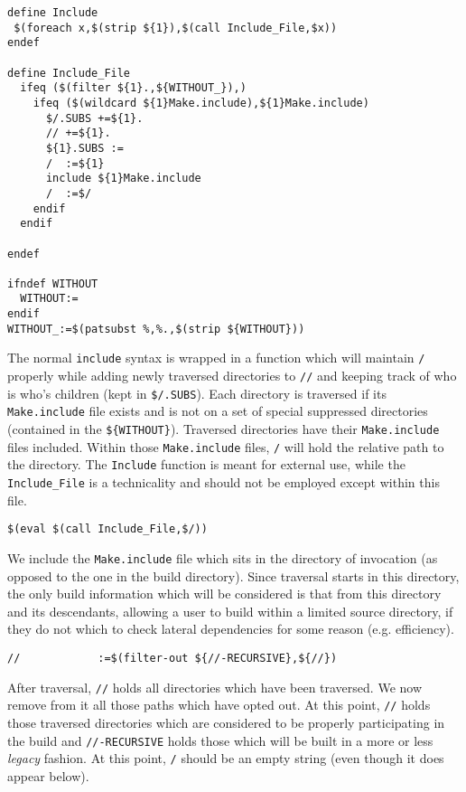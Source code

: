 \documentclass[letterpaper]{article}
\begin{document}
\begin{verbatim}
define Include
 $(foreach x,$(strip ${1}),$(call Include_File,$x))
endef

define Include_File
  ifeq ($(filter ${1}.,${WITHOUT_}),)
    ifeq ($(wildcard ${1}Make.include),${1}Make.include)
      $/.SUBS +=${1}.
      // +=${1}.
      ${1}.SUBS :=
      /  :=${1}
      include ${1}Make.include
      /  :=$/
    endif
  endif

endef

ifndef WITHOUT
  WITHOUT:=
endif
WITHOUT_:=$(patsubst %,%.,$(strip ${WITHOUT}))
\end{verbatim}
The normal \verb+include+ syntax is wrapped in a function which will
maintain \verb+/+ properly while adding newly traversed directories to
\verb+//+ and keeping track of who is who's children (kept in
\verb+$/.SUBS+).  Each directory
is traversed if its \verb+Make.include+ file exists and is not on
a set of special suppressed directories (contained in the \verb+${WITHOUT}+).  Traversed directories
have their \verb+Make.include+ files included.  Within those
\verb+Make.include+ files, \verb+/+ will hold the relative path
to the directory.  The \verb+Include+ function is meant for external
use, while the \verb+Include_File+ is a technicality and should not
be employed except within this file.

\begin{verbatim}
$(eval $(call Include_File,$/))
\end{verbatim}
We include the \verb+Make.include+ file which sits in the directory
of invocation (as opposed to the one in the build directory).  Since traversal
starts in this directory, the only build information which
will be considered is that from this directory and its descendants,
allowing a user to build within a limited source directory, if they
do not which to check lateral dependencies for some reason (e.g.
efficiency).

\begin{verbatim}
//            :=$(filter-out ${//-RECURSIVE},${//})
\end{verbatim}
After traversal, \verb+//+ holds all directories which have been
traversed.  We now remove from it all those paths which have opted
out.  At this point, \verb+//+ holds those traversed directories which are
considered to be properly participating in the build and
\verb+//-RECURSIVE+ holds those which will be built in a more or less
{\em legacy} fashion.  At this point, \verb+/+ should be an
empty string (even though it does appear below).
\end{document}
